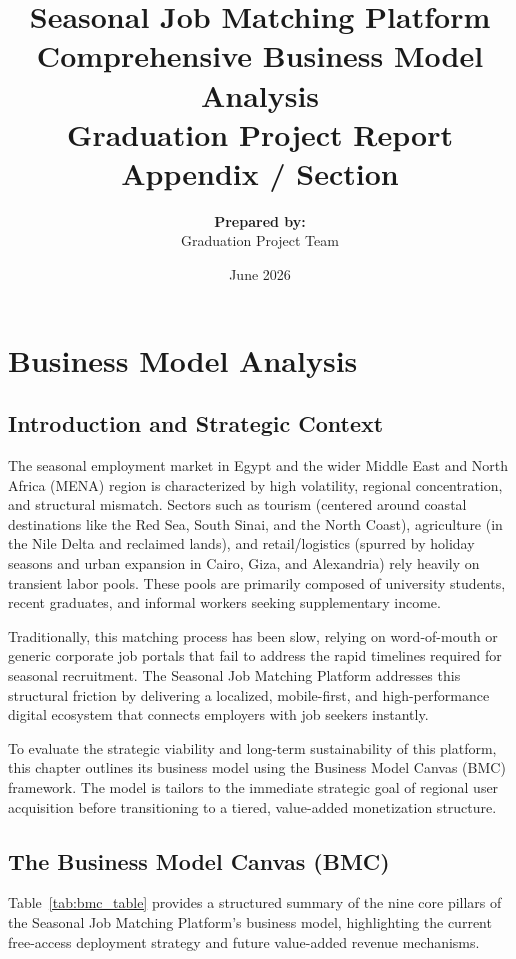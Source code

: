 \documentclass[12pt, a4paper]{report}
\title{
    \vspace{2in}
    \textbf{Seasonal Job Matching Platform}\\
    \Large{Comprehensive Business Model Analysis}\\
    \vspace{0.5in}
    \large{Graduation Project Report Appendix / Section}
    \vspace{1.5in}
}
\author{
    \textbf{Prepared by:}\\
    Graduation Project Team\\
    \vspace{0.5in}
}
\date{
    \vfill
    June 2026
}
\begin{document}
\maketitle
{}
\tableofcontents
\newpage
{}

\chapter{Business Model Analysis}
\label{ch:business_model}

\section{Introduction and Strategic Context}
The seasonal employment market in Egypt and the wider Middle East and North Africa (MENA) region is characterized by high volatility, regional concentration, and structural mismatch. Sectors such as tourism (centered around coastal destinations like the Red Sea, South Sinai, and the North Coast), agriculture (in the Nile Delta and reclaimed lands), and retail/logistics (spurred by holiday seasons and urban expansion in Cairo, Giza, and Alexandria) rely heavily on transient labor pools. These pools are primarily composed of university students, recent graduates, and informal workers seeking supplementary income.

Traditionally, this matching process has been slow, relying on word-of-mouth or generic corporate job portals that fail to address the rapid timelines required for seasonal recruitment. The Seasonal Job Matching Platform addresses this structural friction by delivering a localized, mobile-first, and high-performance digital ecosystem that connects employers with job seekers instantly. 

To evaluate the strategic viability and long-term sustainability of this platform, this chapter outlines its business model using the Business Model Canvas (BMC) framework. The model is tailors to the immediate strategic goal of regional user acquisition before transitioning to a tiered, value-added monetization structure.

\newpage
\section{The Business Model Canvas (BMC)}
Table~\ref{tab:bmc_table} provides a structured summary of the nine core pillars of the Seasonal Job Matching Platform's business model, highlighting the current free-access deployment strategy and future value-added revenue mechanisms.
\end{document}

